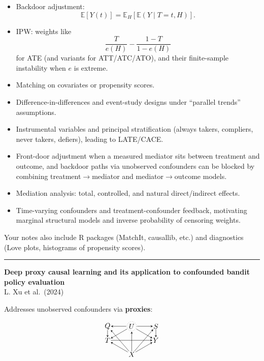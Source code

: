 \documentclass[a5paper]{article}
\providecommand{\tightlist}{%
  \setlength{\itemsep}{0pt}\setlength{\parskip}{0pt}}
\begin{document}
\begin{itemize}
\tightlist
\item
  Backdoor adjustment:
  \[
  \mathbb{E}[Y(t)] =
  \mathbb{E}_H[\mathbb{E}(Y\mid T=t,H)].
  \]
\item
  IPW: weights like \[
  \frac{T}{e(H)} - \frac{1-T}{1-e(H)}\]
  for ATE (and
  variants for ATT/ATC/ATO), and their finite-sample instability when $e$
  is extreme.
\item
  Matching on covariates or propensity scores.
\item
  Difference-in-differences and event-study designs under ``parallel
  trends'' assumptions.
\item
  Instrumental variables and principal stratification (always takers,
  compliers, never takers, defiers), leading to LATE/CACE.
\item
  Front-door adjustment when a measured mediator sits between treatment
  and outcome, and backdoor paths via unobserved confounders can be
  blocked by combining treatment$\to$mediator and mediator$\to$outcome models.
\item
  Mediation analysis: total, controlled, and natural direct/indirect
  effects.
\item
  Time-varying confounders and treatment-confounder feedback, motivating
  marginal structural models and inverse probability of censoring
  weights.
\end{itemize}

Your notes also include R packages (MatchIt, causallib, etc.) and
diagnostics (Love plots, histograms of propensity scores).

\begin{center}\rule{0.5\linewidth}{0.5pt}\end{center}

\textbf{Deep proxy causal learning and its application to confounded
bandit policy evaluation}\\
L. Xu et al.~(2024)

Addresses unobserved confounders via \textbf{proxies}:

\[
\begin{tikzpicture}[>=stealth,xscale=1.2,yscale=.7,inner sep=0pt,outer sep=1pt,baseline={(0,.3)}]
  \node[circle,draw,dotted,inner sep=1pt] (A) at (1,1) {$U$};
  \node (Q) at (0,1)  {$Q$};
  \node (S) at (2,1)  {$S$};
  \node (T) at (0,0)  {$T$};
  \node (Y) at (2,0)  {$Y$};
  \node (X) at (1,-1) {$X$};
  \draw[->] (A) -- (Q);
  \draw[->] (A) -- (S);
  \draw[->] (A) -- (T);
  \draw[->] (A) -- (Y);
  \draw[->] (Q) -- (T);
  \draw[->] (S) -- (Y);
  \draw[->] (T) -- (Y);
  \draw[->] (X) -- (T);
  \draw[->] (X) -- (Q);
  \draw[->] (X) -- (A);
  \draw[->] (X) -- (S);
  \draw[->] (X) -- (Y);
\end{tikzpicture}
\]
\end{document}
